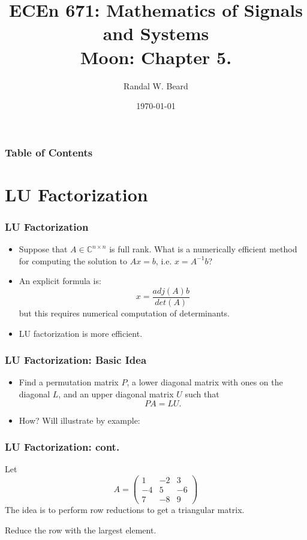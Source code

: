 \documentclass{beamer}
\title{ECEn 671: Mathematics of Signals and Systems \\ 
Moon: Chapter 5.}
\author{Randal W. Beard}
\institute{Brigham Young University}
\date{\today}
\begin{document}
\begin{frame}
	\titlepage
\end{frame}

\begin{frame}[t]
\frametitle{Table of Contents}
\tableofcontents
\end{frame}

\section{LU Factorization}
\frame{\sectionpage}


\begin{frame}\frametitle{LU Factorization}
	\begin{itemize}
		\item 	Suppose that $A \in \mathbb{C}^{n\times n}$ is full rank.  What is a numerically efficient method for computing the solution to $Ax = b$, i.e. $x = A^{-1}b$?
		\item An explicit formula is:
			\[ x = \frac{adj(A)b}{det(A)} \]
			but this requires numerical computation of determinants.
		\item LU factorization is more efficient.
	\end{itemize}
\end{frame}

\begin{frame}\frametitle{LU Factorization: Basic Idea}
	\begin{itemize}
		\item Find a permutation matrix $P$, a lower diagonal matrix with ones on the diagonal $L$, and an upper diagonal matrix $U$ such that
			\[ PA = LU.\]
		\item How?  Will illustrate by example:
	\end{itemize}
\end{frame}

\begin{frame}\frametitle{LU Factorization: cont.}
	Let 
	\[ 
	A = \begin{pmatrix} 
    		1 & -2 & 3\\
    		-4 & 5 & -6\\
    		7 & -8 & 9
    	\end{pmatrix}
    \]
	The idea is to perform row reductions to get a triangular matrix.  
	\par{}  Reduce the row with the largest element.
\end{frame}
\end{document}
